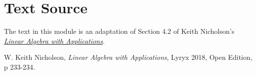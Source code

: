 \documentclass{ximera}
\begin{document}
\section*{Text Source}
The text in this module is an adaptation of Section 4.2 of Keith Nicholson's \href{https://open.umn.edu/opentextbooks/textbooks/linear-algebra-with-applications}{\it Linear Algebra with Applications}.

W. Keith Nicholson, {\it Linear Algebra with Applications}, Lyryx 2018, Open Edition, p 233-234.
\end{document}
